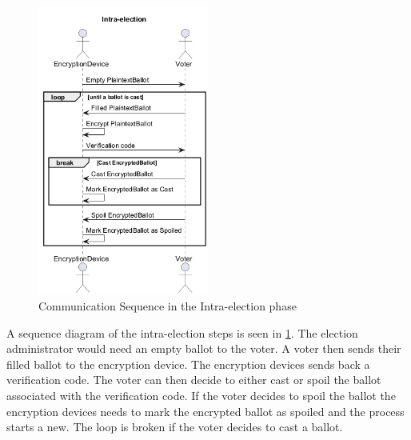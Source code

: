 \begin{figure}
    \centering
    \includegraphics[width=0.5\textwidth]{abbildungen/Diagramme/communication-seq1.png}
    \caption{Communication Sequence in the Intra-election phase}
    \label{Fig:comm-intra}
\end{figure}


A sequence diagram of the intra-election steps is seen in \ref{Fig:comm-intra}. The election administrator would need an empty ballot to the voter. A voter then sends their filled ballot to the encryption device. The encryption devices sends back a verification code. The voter can then decide to either cast or spoil the ballot associated with the verification code. If the voter decides to spoil the ballot the encryption devices needs to mark the encrypted ballot as spoiled and the process starts a new. The loop is broken if the voter decides to cast a ballot.

